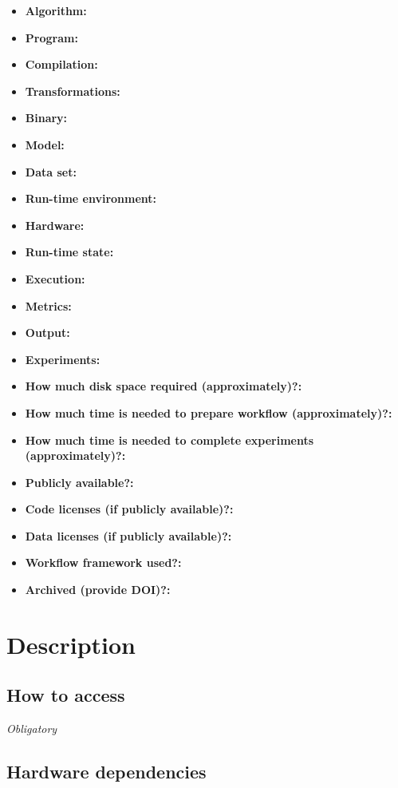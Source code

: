 {\small
\begin{itemize}
  \item {\bf Algorithm: }
  \item {\bf Program: }
  \item {\bf Compilation: }
  \item {\bf Transformations: }
  \item {\bf Binary: }
  \item {\bf Model: }
  \item {\bf Data set: }
  \item {\bf Run-time environment: }
  \item {\bf Hardware: }
  \item {\bf Run-time state: }
  \item {\bf Execution: }
  \item {\bf Metrics: }
  \item {\bf Output: }
  \item {\bf Experiments: }
  \item {\bf How much disk space required (approximately)?: }
  \item {\bf How much time is needed to prepare workflow (approximately)?: }
  \item {\bf How much time is needed to complete experiments (approximately)?: }
  \item {\bf Publicly available?: }
  \item {\bf Code licenses (if publicly available)?: }
  \item {\bf Data licenses (if publicly available)?: }
  \item {\bf Workflow framework used?: }
  \item {\bf Archived (provide DOI)?: }
\end{itemize}
}

\section{Description}

\subsection{How to access}

{\em Obligatory}

\subsection{Hardware dependencies}

